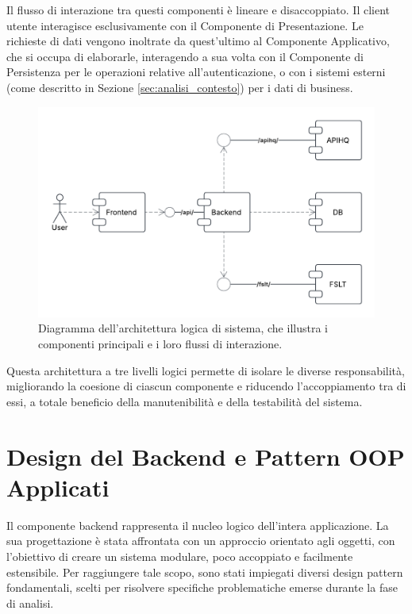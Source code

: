 \documentclass[12pt,a4paper,openright,twoside]{book}
\begin{document}
Il flusso di interazione tra questi componenti è lineare e disaccoppiato. Il client utente interagisce esclusivamente con il Componente di Presentazione. Le richieste di dati vengono inoltrate da quest'ultimo al Componente Applicativo, che si occupa di elaborarle, interagendo a sua volta con il Componente di Persistenza per le operazioni relative all'autenticazione, o con i sistemi esterni (come descritto in Sezione \ref{sec:analisi_contesto}) per i dati di business.

\vspace{1cm} %

\begin{figure}[h!]
    \centering
    \includegraphics[width=\textwidth]{figures/components.pdf}
    \caption{Diagramma dell'architettura logica di sistema, che illustra i componenti principali e i loro flussi di interazione.}
    \label{fig:logical_architecture_diagram}
\end{figure}

\vspace{1cm} %

Questa architettura a tre livelli logici permette di isolare le diverse responsabilità, migliorando la coesione di ciascun componente e riducendo l'accoppiamento tra di essi, a totale beneficio della manutenibilità e della testabilità del sistema.
\section{Design del Backend e Pattern OOP Applicati}
\label{sec:design_backend_oop}

Il componente backend rappresenta il nucleo logico dell'intera applicazione. La sua progettazione è stata affrontata con un approccio orientato agli oggetti, con l'obiettivo di creare un sistema modulare, poco accoppiato e facilmente estensibile. Per raggiungere tale scopo, sono stati impiegati diversi design pattern fondamentali, scelti per risolvere specifiche problematiche emerse durante la fase di analisi.
\end{document}
